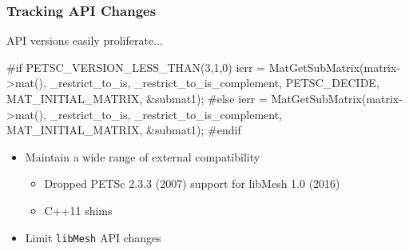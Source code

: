 \documentclass[mathserif]{beamer}
\newcommand{\software}[1]{{\texttt{#1}}}
\newcommand{\libMesh}{\software{libMesh}}
\begin{document}
\begin{frame}[fragile]
\frametitle{Tracking API Changes}

\begin{block}{API versions easily proliferate...}
\small
\begin{semiverbatim}
#if PETSC_VERSION_LESS_THAN(3,1,0)
  ierr = MatGetSubMatrix(matrix->mat(),
           _restrict_to_is, _restrict_to_is_complement,
           \alert{PETSC_DECIDE}, MAT_INITIAL_MATRIX, &submat1);
#else
  ierr = MatGetSubMatrix(matrix->mat(),
           _restrict_to_is, _restrict_to_is_complement,
           MAT_INITIAL_MATRIX, &submat1);
#endif
\end{semiverbatim}
\end{block}

\begin{itemize}
	\item Maintain a wide range of external compatibility
        \begin{itemize}
            \item Dropped PETSc 2.3.3 (2007) support for libMesh 1.0 (2016)
            \item C++11 shims
        \end{itemize}
	\item Limit \libMesh{} API changes
\end{itemize}

\end{frame}
\end{document}
